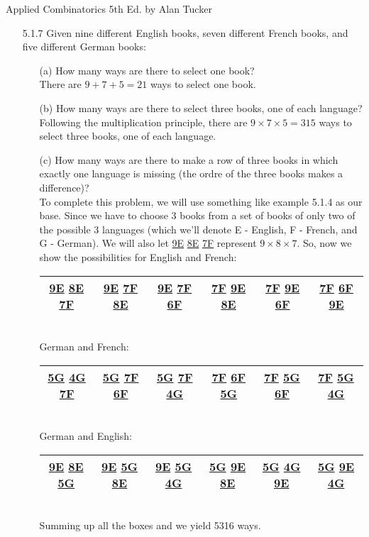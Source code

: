 \documentclass[12pt]{article}
\newcommand{\un}[1]{\underline{#1}}
\begin{document}
Applied Combinatorics 5th Ed. by Alan Tucker
\begin{enumerate}

\item[5.1.7] Given nine different English books, seven different French books, and five different German books: 
\begin{enumerate}
\item[(a)] How many ways are there to select one book? \\
There are $9 + 7 + 5 = 21$ ways to select one book.
\item[(b)] How many ways are there to select three books, one of each language? \\
Following the multiplication principle, there are $9 \times 7 \times 5 = 315$ ways to 
select three books, one of each language.
\item[(c)] How many ways are there to make a row of three books in which exactly one language is missing (the ordre of the three books makes a difference)? \\
To complete this problem, we will use something like example 5.1.4 as our base. Since we have
to choose 3 books from a set of books of only two of the possible 3 languages (which we'll denote
E - English, F - French, and G - German). We will also 
let \un{9E} \un{8E} \un{7F} represent $9 \times 8 \times 7$. So, now we show the possibilities
for English and French: \\
\begin{tabular}{|c|c|c|c|c|c|}
\hline
\un{9E} \un{8E} \un{7F} & \un{9E} \un{7F} \un{8E} & \un{9E} \un{7F} \un{6F} &
\un{7F} \un{9E} \un{8E} & \un{7F} \un{9E} \un{6F} & \un{7F} \un{6F} \un{9E} \\
\hline
\end{tabular} \\
German and French: \\
\begin{tabular}{|c|c|c|c|c|c|}
\hline
\un{5G} \un{4G} \un{7F} & \un{5G} \un{7F} \un{6F} & \un{5G} \un{7F} \un{4G} &
\un{7F} \un{6F} \un{5G} & \un{7F} \un{5G} \un{6F} & \un{7F} \un{5G} \un{4G} \\
\hline
\end{tabular} \\
German and English: \\
\begin{tabular}{|c|c|c|c|c|c|}
\hline
\un{9E} \un{8E} \un{5G} & \un{9E} \un{5G} \un{8E} & \un{9E} \un{5G} \un{4G} &
\un{5G} \un{9E} \un{8E} & \un{5G} \un{4G} \un{9E} & \un{5G} \un{9E} \un{4G} \\
\hline
\end{tabular} \\
Summing up all the boxes and we yield 5316 ways.
\end{enumerate}


\end{enumerate}
\end{document}
